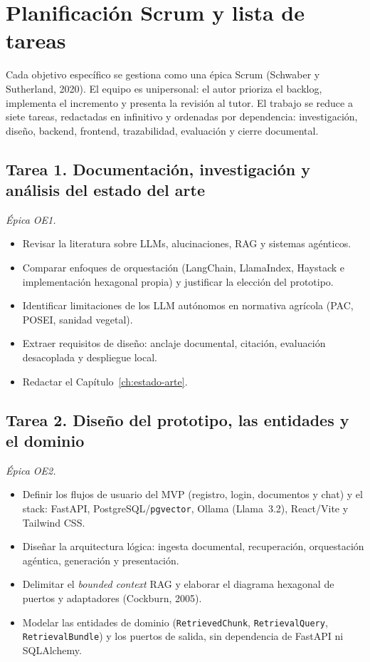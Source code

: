 \section{Planificación Scrum y lista de tareas}

Cada objetivo específico se gestiona como una épica Scrum (Schwaber y Sutherland, 2020). El equipo es unipersonal: el autor prioriza el backlog, implementa el incremento y presenta la revisión al tutor. El trabajo se reduce a siete tareas, redactadas en infinitivo y ordenadas por dependencia: investigación, diseño, backend, frontend, trazabilidad, evaluación y cierre documental.

\subsection{Tarea 1. Documentación, investigación y análisis del estado del arte}
\textit{Épica OE1.}

\begin{itemize}
  \item Revisar la literatura sobre LLMs, alucinaciones, RAG y sistemas agénticos.
  \item Comparar enfoques de orquestación (LangChain, LlamaIndex, Haystack e implementación hexagonal propia) y justificar la elección del prototipo.
  \item Identificar limitaciones de los LLM autónomos en normativa agrícola (PAC, POSEI, sanidad vegetal).
  \item Extraer requisitos de diseño: anclaje documental, citación, evaluación desacoplada y despliegue local.
  \item Redactar el Capítulo~\ref{ch:estado-arte}.
\end{itemize}

\subsection{Tarea 2. Diseño del prototipo, las entidades y el dominio}
\textit{Épica OE2.}

\begin{itemize}
  \item Definir los flujos de usuario del MVP (registro, login, documentos y chat) y el stack: FastAPI, PostgreSQL/\texttt{pgvector}, Ollama (Llama~3.2), React/Vite y Tailwind CSS.
  \item Diseñar la arquitectura lógica: ingesta documental, recuperación, orquestación agéntica, generación y presentación.
  \item Delimitar el \emph{bounded context} RAG y elaborar el diagrama hexagonal de puertos y adaptadores (Cockburn, 2005).
  \item Modelar las entidades de dominio (\texttt{RetrievedChunk}, \texttt{RetrievalQuery}, \texttt{RetrievalBundle}) y los puertos de salida, sin dependencia de FastAPI ni SQLAlchemy.
\end{itemize}

